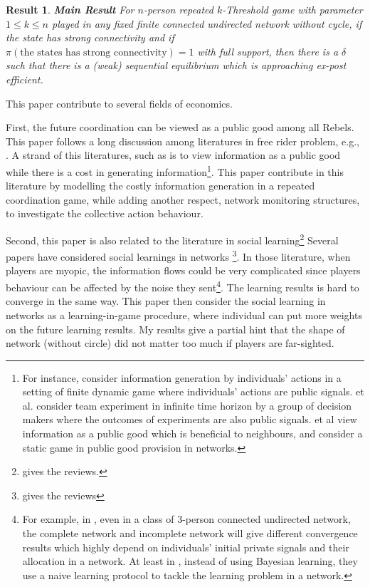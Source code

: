\documentclass[12pt,letter]{article}
\newtheorem{result}{Result}
\theoremstyle{definition}
\theoremstyle{remark}
\theoremstyle{claim}
\begin{document}
\begin{result}\textbf{Main Result}
For $n$-person repeated $k$-Threshold game with parameter $1\leq k \leq n$ played in any fixed finite connected undirected network without cycle,
if the state has strong connectivity and if $\pi(\text{the states has strong connectivity})=1$ with full support, then there is a $\delta$ such that there is a (weak) sequential equilibrium which is approaching ex-post efficient.
\end{result}




This paper contribute to several fields of economics. 

First, the future coordination can be viewed as a public good among all Rebels. This paper follows a long discussion among literatures in free rider problem, e.g., \citep{OLSON1965}\citep{Granovetter1978}. A strand of this literatures, such as \citep{Lohmann1994} is to view information as a public good while there is a cost in generating information\footnote{For instance, \citep{Lohmann1993}\citep{Lohmann1994} consider information generation by individuals' actions in a setting of finite dynamic game where individuals' actions are public signals. \citep{Bolton1999} et al. consider team experiment in infinite time horizon by a group of decision makers where the outcomes of experiments are also public signals. \citep{Bramoulle2007} et al view information as a public good which is beneficial to neighbours, and consider a static game in public good provision in networks.}. This paper contribute in this literature by modelling the costly information generation in a repeated coordination game, while adding another respect, network monitoring structures, to investigate the collective action behaviour.

Second, this paper is also related to the literature in social learning\footnote{\citep{Bikhchandani1998} \citep{Cao2001} gives the reviews.} Several papers have considered social learnings in networks \footnote{\citep{Goyal2012} gives the reviews}. In those literature, when players are myopic, the information flows could be very complicated since players behaviour can be affected by the noise they sent\footnote{For example, in \citep{RePEc:eee:gamebe:v:45:y:2003:i:2:p:329-346},  even in a class of 3-person connected undirected network, the complete network and incomplete network will give different convergence results which highly depend on individuals' initial private signals and their allocation in a network. At least in \citep{Golub2010}, instead of using Bayesian learning, they use a naive learning protocol to tackle the learning problem in a network.}. The learning results is hard to converge in the same way. This paper then consider the social learning in networks as a learning-in-game procedure, where individual can put more weights on the future learning results. My results give a partial hint that the shape of network (without circle) did not matter too much if players are far-sighted.
\end{document}

